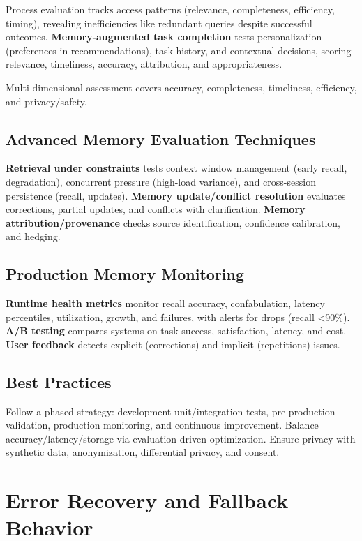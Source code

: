 \begin{TNtwocol}
Process evaluation tracks access patterns (relevance, completeness, efficiency, timing), revealing inefficiencies like redundant queries despite successful outcomes. \textbf{Memory-augmented task completion} tests personalization (preferences in recommendations), task history, and contextual decisions, scoring relevance, timeliness, accuracy, attribution, and appropriateness.
​

Multi-dimensional assessment covers accuracy, completeness, timeliness, efficiency, and privacy/safety.
​

\subsection*{Advanced Memory Evaluation Techniques}

\textbf{Retrieval under constraints} tests context window management (early recall, degradation), concurrent pressure (high-load variance), and cross-session persistence (recall, updates). \textbf{Memory update/conflict resolution} evaluates corrections, partial updates, and conflicts with clarification. \textbf{Memory attribution/provenance} checks source identification, confidence calibration, and hedging.
​

\subsection*{Production Memory Monitoring}

\textbf{Runtime health metrics} monitor recall accuracy, confabulation, latency percentiles, utilization, growth, and failures, with alerts for drops (recall <90\%). \textbf{A/B testing} compares systems on task success, satisfaction, latency, and cost. \textbf{User feedback} detects explicit (corrections) and implicit (repetitions) issues.
​

\subsection*{Best Practices}

Follow a phased strategy: development unit/integration tests, pre-production validation, production monitoring, and continuous improvement. Balance accuracy/latency/storage via evaluation-driven optimization. Ensure privacy with synthetic data, anonymization, differential privacy, and consent.
​


\section{Error Recovery and Fallback Behavior}


\end{TNtwocol}
